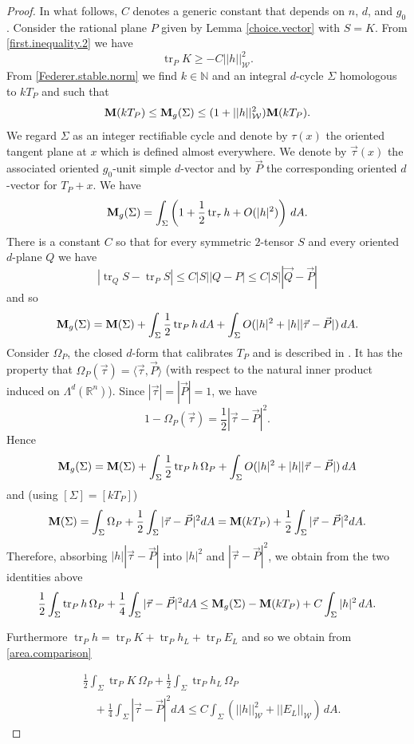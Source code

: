 \documentclass[11pt]{amsart}
\def\R{\mathbb R}
\def\N{\mathbb N}
\def\tr{\operatorname{tr}}
\theoremstyle{remark}
\theoremstyle{definition}
\begin{document}
\begin{proof}
		
		In what follows, $C$ denotes a generic constant that depends  on $n$, {$d$, and $g_0$.}
		Consider the rational plane $P$ given by Lemma \ref{choice.vector} with  $S=K$. {From \eqref{first.inequality.2}  we have}
		$$
		\tr _P K\geq -C||h||^2_{\mathcal W}.
		$$
		{From \eqref{Federer.stable.norm} we find $k\in\N$ and an integral $d$-cycle $\Sigma$ homologous to $kT_P$ and such that} 
		\begin{equation}\label{area.comparison}
			{\bf M}(kT_P)\leq {\bf M}_g(\Sigma)\leq (1+||h||_{\mathcal W}^2){\bf M}(kT_P).
		\end{equation}
		We regard $\Sigma$ as an integer rectifiable cycle and denote by $\tau(x)$ the oriented tangent plane at $x$ which is defined almost everywhere. We denote by $\vec{\tau}(x)$ the associated oriented $g_0$-unit simple $d$-vector and by $\vec{P}$ the corresponding oriented $d$-vector for $T_P+x$. We have
		$$
		{\bf M}_g(\Sigma)=\int_\Sigma\left(1+\frac12\tr _\tau h+O(|h|^2)\right)\,dA.
		$$
		There is a constant $C$ so that for every symmetric $2$-tensor $S$ and every oriented $d$-plane $Q$ we have
		$$
		|\tr _Q S-\tr _P S|\leq C|S||Q-P|\leq C|S||\vec Q-\vec P|
		$$
		and so
		$$
		{\bf M}_g(\Sigma)={\bf M}(\Sigma)+\int_\Sigma \frac12\tr _P h\,dA+\int_\Sigma O(|h|^2+|h||\vec \tau-\vec P|)\,dA.
		$$
		Consider $\Omega_P$, the closed $d$-form that calibrates $T_P$ and is described in \cite[Example~II, p.~58]{HarveyLawson82}.  It has the property that $\Omega_P(\vec\tau)=\langle\vec\tau,\vec P\rangle$ (with respect to the natural inner product induced on $\Lambda^d(\R^n)$).  Since $|\vec\tau|=|\vec P|=1$, we have
		$$
		1-\Omega_P(\vec\tau)=\frac{1}{2}|\vec \tau-\vec P|^2.
		$$
		Hence
		$$
		{\bf M}_g(\Sigma)={\bf M}(\Sigma)+\int_\Sigma \frac12\tr _P h\,\Omega_P+\int_\Sigma O(|h|^2+|h||\vec \tau-\vec P|)\,dA
		$$
		and (using $[\Sigma]={[kT_P]}$)
		$${\bf M}(\Sigma)=\int_\Sigma\Omega_P+\frac12\int_\Sigma |\vec \tau-\vec P|^2dA={{\bf M}(kT_P)}+\frac12\int_\Sigma |\vec \tau-\vec P|^2dA.$$
		Therefore, absorbing $|h||\vec \tau-\vec P|$ into $|h|^2$ and  $|\vec \tau-\vec P|^2$, we obtain from the two identities above
		$$
		\frac12\int_\Sigma\tr _P h\,\Omega_P+\frac14\int_\Sigma |\vec \tau-\vec P|^2dA\leq {\bf M}_g(\Sigma)-{\bf M}(kT_P)+C\int_\Sigma |h|^2\,dA.
		$$
		
		Furthermore
		$\tr _P h=\tr _P K+\tr _P h_L+\tr _P E_L$ and so we obtain from \eqref{area.comparison}
		
		\begin{equation}\label{second.inequality}
			\begin{aligned}
				&\frac12\int_{\Sigma}\tr _P K\,\Omega_P+\frac12\int_{\Sigma}\tr _P h_L\,\Omega_P\\
				&\quad+\frac14\int_\Sigma |\vec \tau-\vec P|^2dA\leq C\int_{\Sigma}\left(||h||_{\mathcal W}^2+||E_L||_{\mathcal W}\right)\,dA.
			\end{aligned}
		\end{equation}
		

\end{proof}
\end{document}
